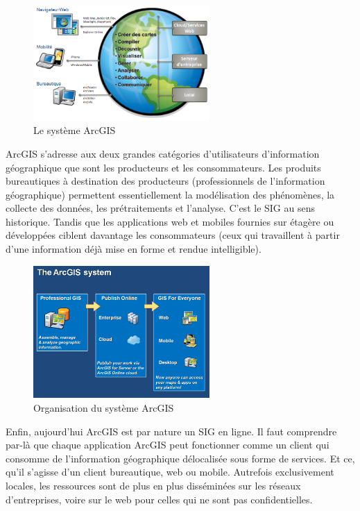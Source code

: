 \documentclass[11pt]{article}
\begin{document}
\begin{figure}[H]
	\center \includegraphics[width=0.6\textwidth]{img/cours/le_systeme_arcgis_10.png}
	\caption{Le système ArcGIS}
\end{figure}

ArcGIS s'adresse aux deux grandes catégories d'utilisateurs d'information géographique que sont les producteurs et les consommateurs. Les produits bureautiques à destination des producteurs (professionnels de l'information géographique) permettent essentiellement la modélisation des phénomènes, la collecte des données, les prétraitements et l'analyse. C'est le SIG au sens historique. Tandis que les applications web et mobiles fournies sur étagère ou développées ciblent davantage les consommateurs (ceux qui travaillent à partir d'une information déjà mise en forme et rendue intelligible). 

\begin{figure}[H]
	\center \includegraphics[width=0.6\textwidth]{img/cours/le_systeme_arcgis_10-2.png}
	\caption{Organisation du système ArcGIS}
\end{figure}

Enfin, aujourd'hui ArcGIS est par nature un SIG en ligne. Il faut comprendre par-là que chaque application ArcGIS peut fonctionner comme un client qui consomme de l'information géographique délocalisée sous forme de services. Et ce, qu'il s'agisse d'un client bureautique, web ou mobile. Autrefois exclusivement locales, les ressources sont de plus en plus disséminées sur les réseaux d'entreprises, voire sur le web pour celles qui ne sont pas confidentielles.
\end{document}

